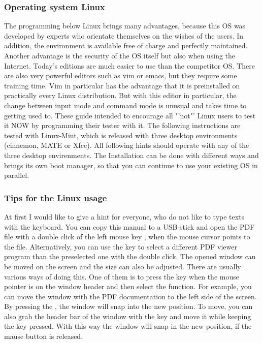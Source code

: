 \subsubsection{Operating system Linux}

The programming below Linux brings many advantages, because this OS was developed by experts
who orientate themselves on the wishes of the users.
In addition, the environment is available free of charge and perfectly maintained.
Another advantage is the security of the OS itself but also when using the Internet.
Today's editions are much easier to use than the competitor OS.
There are also very powerful editors such as vim or emacs, but they require some training time.
Vim in particular has the advantage that it is preinstalled on practically every Linux distribution.
But with this editor in particular, the change between input mode and command mode
is unusual and takes time to getting used to.
These guide intended to encourage all "'not"' Linux users to test it NOW
by programming their tester with it.
The following instructions are tested with Linux-Mint, which is released with
three desktop environments (cinnemon, MATE or Xfce).
All following hints should operate with any of the three desktop envirenments.
The Installation can be done with different ways and brings its own boot manager,
so that you can continue to use your existing OS in parallel. 

\subsubsection{Tips for the Linux usage}

At first I would like to give a hint for everyone, who do not like to
type texts with the keyboard.
You can copy this manual to a USB-stick and open the PDF file with a double click
of the left mouse key \LMB,
when the mouse cursor points to the file.
Alternatively, you can use the \RMB key to select a different PDF viewer program
than the preselected one with the double click.
The opened window can be moved on the screen and the size can also be adjusted.
There are usually various ways of doing this.
One of them is to press the \RMB key when the mouse pointer is on the window header and
then select the  function.
For example, you can move the window with the PDF documentation to the left side of the screen.
By pressing the \LMB, the window will snap into the new position. 
To move, you can also grab the header bar of the window with the \LMB key and move it
while keeping the \LMB key pressed.
With this way the window will snap in the new position, if the mause button is released.

